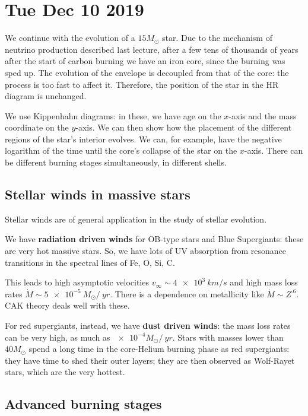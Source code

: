 \documentclass[main.tex]{subfiles}
\begin{document}
\section*{Tue Dec 10 2019}

We continue with the evolution of a \(15 M_{\odot}\) star. 
Due to the mechanism of neutrino production described last lecture, after a few tens of thousands of years after the start of carbon burning we have an iron core, since the burning was sped up.
The evolution of the envelope is decoupled from that of the core: the process is too fast to affect it. Therefore, the position of the star in the HR diagram is unchanged.

We use Kippenhahn diagrams: in these, we have age on the \(x\)-axis and the mass coordinate on the \(y\)-axis. We can then show how the placement of the different regions of the star's interior evolves.
We can, for example, have the negative logarithm of the time until the core's collapse of the star on the \(x\)-axis.
There can be different burning stages simultaneously, in different shells. 

\subsection{Stellar winds in massive stars}

Stellar winds are of general application in the study of stellar evolution. 

We have \textbf{radiation driven winds} for OB-type stars and Blue Supergiants: these are very hot massive stars.
So, we have lots of UV absorption from resonance transitions in the spectral lines of Fe, O, Si, C.

This leads to high asymptotic velocities \(v_{ \infty } \sim \SI{4e3}{km/s}\) and high mass loss rates \(\dot{M} \sim \SI{5e-5}{} M_{\odot} / \SI{}{yr}\). 
There is a dependence on metallicity like \(\dot{M} \sim Z^{\num{.6}}\).
CAK theory deals well with these.

For red supergiants, instead, we have 
\textbf{dust driven winds}: the mass loss rates can be very high, as much as \(\num{e-4} M_{\odot} / \SI{}{yr}\).
Stars with masses lower than \(40 M_{\odot}\) spend a long time in the core-Helium burning phase as red supergiants: they have time to shed their outer layers; they are then observed as Wolf-Rayet stars, which are the very hottest.

\subsection{Advanced burning stages}
\end{document}
